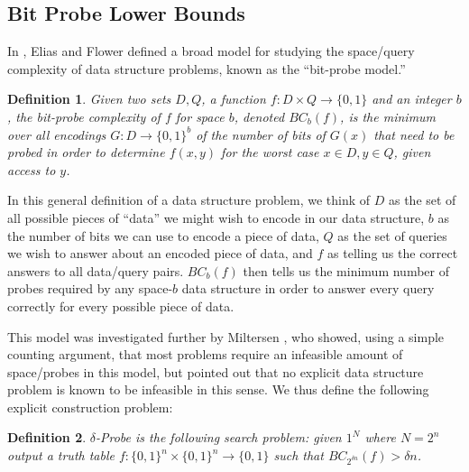 \documentclass[11pt]{article}
\newtheorem{definition}{Definition}
\begin{document}
\subsection{Bit Probe Lower Bounds}
In \cite{Elias-Flower}, Elias and Flower defined a broad model for studying the space/query complexity of data structure problems, known as the ``bit-probe model.'' 
\begin{definition}
Given two sets $D,Q$, a function $f: D \times Q \rightarrow \{0,1\}$ and an integer $b$, the bit-probe complexity of $f$ for space $b$, denoted $BC_b(f)$, is the minimum over all encodings $G: D \rightarrow \{0,1\}^b$ of the number of bits of $G(x)$ that need to be probed in order to determine $f(x,y)$ for the worst case $x \in D,y \in Q$, given access to $y$.
\end{definition}
In this general definition of a data structure problem, we think of $D$ as the set of all possible pieces of ``data'' we might wish to encode in our data structure, $b$ as the number of bits we can use to encode a piece of data, $Q$ as the set of queries we wish to answer about an encoded piece of data, and $f$ as telling us the correct answers to all data/query pairs. $BC_b(f)$ then tells us the minimum number of probes required by any space-$b$ data structure in order to answer every query correctly for every possible piece of data.

This model was investigated further by Miltersen \cite{Bro}, who showed, using a simple counting argument, that most problems require an infeasible amount of space/probes in this model, but pointed out that no explicit data structure problem is known to be infeasible in this sense. We thus define the following explicit construction problem:
\begin{definition}
{\sc $\delta$-Probe} is the following search problem: given $1^N$ where $N = 2^n$ output a truth table $f: \{0,1\}^n \times \{0,1\}^n \rightarrow \{0,1\}$ such that $BC_{2^{\delta n}}(f) > \delta n$.
\end{definition}
\end{document}
